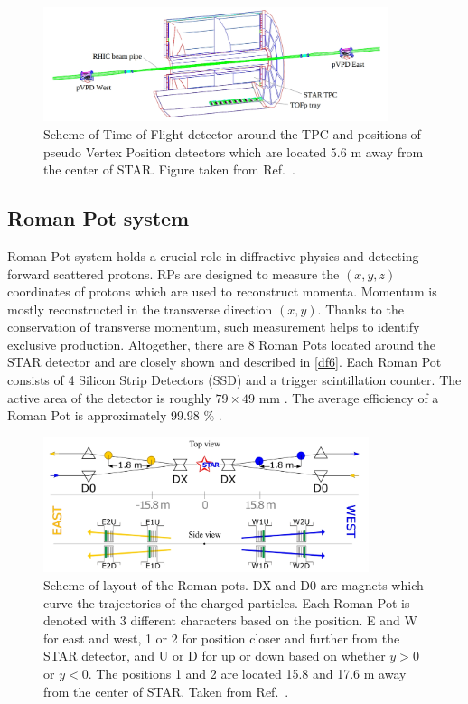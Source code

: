 \FloatBarrier
\begin{figure}[ht]
    \centering
    \includegraphics[width=0.9\textwidth]{figures/TOF.jpg}
    \caption[Schematic view of the Time Of Flight detector]{Scheme of Time of Flight detector around the TPC and positions of pseudo Vertex Position detectors which are located 5.6 m away from the center of STAR. Figure taken from Ref.~\cite{TOF}.}
    \label{df5}
\end{figure}
\FloatBarrier

\subsection{Roman Pot system}
\label{RPs}
Roman Pot system holds a crucial role in diffractive physics and detecting forward scattered protons. RPs are designed to measure the $(x,y,z)$ coordinates of protons which are used to reconstruct momenta. Momentum is mostly reconstructed in the transverse direction $(x,y)$. Thanks to the conservation of transverse momentum, such measurement helps to identify exclusive production. Altogether, there are 8 Roman Pots located around the STAR detector and are closely shown and described in \autoref{df6}. Each Roman Pot consists of 4 Silicon Strip Detectors (SSD) and a trigger scintillation counter. The active area of the detector is roughly $79 \times 49$ mm \cite{raphalmsc}. The average efficiency of a Roman Pot is approximately 99.98 $\%$ \cite{STAR}.

\FloatBarrier
\begin{figure}[ht]
    \centering
    \includegraphics[width=0.85\textwidth]{figures/RP.jpg}
    \caption[Schematic view of the Roman Pot system]{Scheme of layout of the Roman pots. DX and D0 are magnets which curve the trajectories of the charged particles. Each Roman Pot is denoted with 3 different characters based on the position. E and W for east and west, 1 or 2 for position closer and further from the STAR detector, and U or D for up or down based on whether $y>0$ or $y<0$. The positions 1 and 2 are located 15.8 and 17.6 m away from the center of STAR. Taken from Ref.~\cite{raphalthesis}.}
    \label{df6}
\end{figure}
\FloatBarrier

